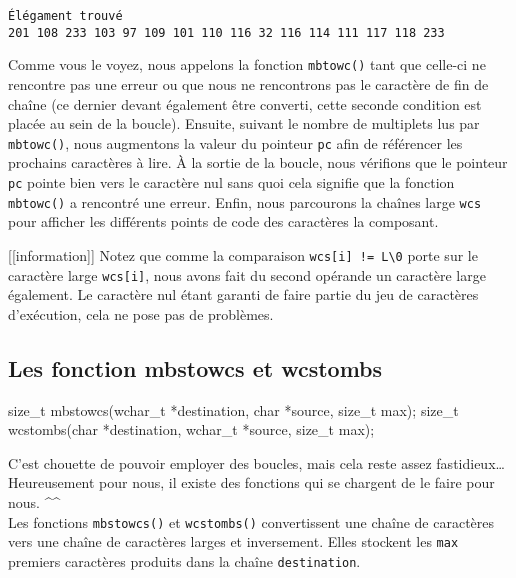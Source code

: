\documentclass[]{article}
\newenvironment{Shaded}{}{}
\newcommand{\DataTypeTok}[1]{\textcolor[rgb]{0.56,0.13,0.00}{{#1}}}
\newcommand{\NormalTok}[1]{{#1}}
\begin{document}
\begin{verbatim}
Élégament trouvé                   
201 108 233 103 97 109 101 110 116 32 116 114 111 117 118 233 
\end{verbatim}

Comme vous le voyez, nous appelons la fonction \texttt{mbtowc()} tant
que celle-ci ne rencontre pas une erreur ou que nous ne rencontrons pas
le caractère de fin de chaîne (ce dernier devant également être
converti, cette seconde condition est placée au sein de la boucle).
Ensuite, suivant le nombre de multiplets lus par \texttt{mbtowc()}, nous
augmentons la valeur du pointeur \texttt{pc} afin de référencer les
prochains caractères à lire. À la sortie de la boucle, nous vérifions
que le pointeur \texttt{pc} pointe bien vers le caractère nul sans quoi
cela signifie que la fonction \texttt{mbtowc()} a rencontré une erreur.
Enfin, nous parcourons la chaînes large \texttt{wcs} pour afficher les
différents points de code des caractères la composant.

{[}{[}information{]}{]} \textbar{} Notez que comme la comparaison
\texttt{wcs{[}i{]}\ !=\ L\textquotesingle{}\textbackslash{}0\textquotesingle{}}
porte sur le caractère large \texttt{wcs{[}i{]}}, nous avons fait du
second opérande un caractère large également. Le caractère nul étant
garanti de faire partie du jeu de caractères d'exécution, cela ne pose
pas de problèmes.

\subsection{Les fonction mbstowcs et
wcstombs}\label{les-fonction-mbstowcs-et-wcstombs}

\begin{Shaded}
\begin{Highlighting}[]
\DataTypeTok{size_t} \NormalTok{mbstowcs(}\DataTypeTok{wchar_t} \NormalTok{*destination, }\DataTypeTok{char} \NormalTok{*source, }\DataTypeTok{size_t} \NormalTok{max);}
\DataTypeTok{size_t} \NormalTok{wcstombs(}\DataTypeTok{char} \NormalTok{*destination, }\DataTypeTok{wchar_t} \NormalTok{*source, }\DataTypeTok{size_t} \NormalTok{max);}
\end{Highlighting}
\end{Shaded}

C'est chouette de pouvoir employer des boucles, mais cela reste assez
fastidieux\ldots{} Heureusement pour nous, il existe des fonctions qui
se chargent de le faire pour nous. \^{}\^{}\\
Les fonctions \texttt{mbstowcs()} et \texttt{wcstombs()} convertissent
une chaîne de caractères vers une chaîne de caractères larges et
inversement. Elles stockent les \texttt{max} premiers caractères
produits dans la chaîne \texttt{destination}.
\end{document}
